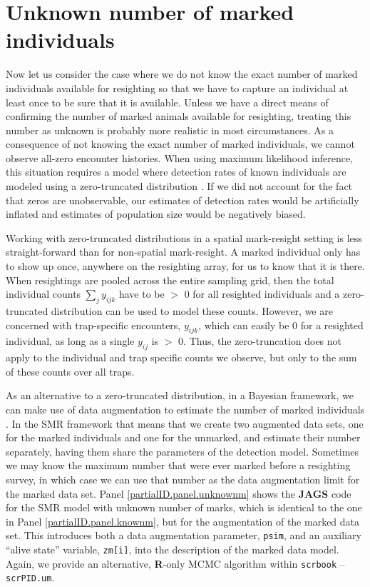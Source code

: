 \section {Unknown number of marked individuals}
\label{partialID.sec.unknown}
Now let us consider the case where we do not know the exact number of
marked individuals available for resighting so that we have to capture
an individual at least once to be sure that it is available. Unless we
have a direct means of confirming the number of marked animals
available for resighting, treating this number as unknown is probably
more realistic
in most circumstances. As a consequence of not knowing the exact number of marked individuals, we cannot observe all-zero encounter histories. When using maximum likelihood inference, this situation requires a model where detection rates of known individuals are modeled using a zero-truncated distribution \citep{mcclintock_etal:2009biometrics}. If we did not account for the fact that zeros are unobservable, our estimates of detection rates would be artificially inflated and estimates of population size would be negatively biased.

Working with zero-truncated distributions in a spatial mark-resight
setting is less straight-forward than for non-spatial mark-resight. A
marked individual only has to show up once, anywhere on the resighting
array,
for us to know that it is there. When resightings are pooled
across the entire sampling grid, then the total individual counts $\sum_j y_{ijk}$ have to be $>$ 0 for all resighted individuals and a zero-truncated distribution can be used to model these counts. However, we are concerned with trap-specific encounters, $y_{ijk}$, which can easily be 0 for a resighted individual, as long as a single $y_{ij}$ is $>$ 0. Thus, the zero-truncation does not apply to the individual and trap specific counts we observe, but only to the sum of these counts over all traps.

As an alternative to a zero-truncated distribution, in a Bayesian
framework, we can make use of data augmentation to estimate the number
of marked individuals \citep{mcclintock_hoeting:2010}. In the SMR framework that means that we create two augmented data sets, one for the marked individuals and one for the unmarked, and estimate their number separately, having them share the parameters of the detection model. Sometimes we may know the maximum number that were ever marked before a resighting survey, in which case we can use that number as the data augmentation limit for the marked data set. Panel \ref{partialID.panel.unknownm} shows the {\bf JAGS} code for the SMR model with unknown number of marks, which is identical to the one in Panel \ref{partialID.panel.knownm}, but for the augmentation of the marked data set. This introduces both a data augmentation parameter, {\tt psim}, and an auxiliary ``alive state'' variable, {\tt zm[i]}, into the description of the marked data model. Again, we provide an alternative, {\bf R}-only MCMC algorithm within {\tt scrbook} -- {\tt scrPID.um}.

